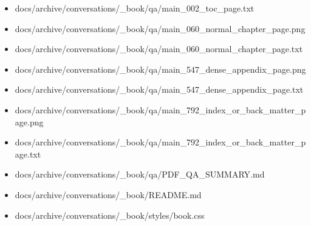 \documentclass[11pt,a4paper]{report}
\begin{document}
\begin{itemize}
\item docs/archive/conversations/\_book/qa/main\_002\_toc\_page.txt
\item docs/archive/conversations/\_book/qa/main\_060\_normal\_chapter\_page.png
\item docs/archive/conversations/\_book/qa/main\_060\_normal\_chapter\_page.txt
\item docs/archive/conversations/\_book/qa/main\_547\_dense\_appendix\_page.png
\item docs/archive/conversations/\_book/qa/main\_547\_dense\_appendix\_page.txt
\item docs/archive/conversations/\_book/qa/main\_792\_index\_or\_back\_matter\_page.png
\item docs/archive/conversations/\_book/qa/main\_792\_index\_or\_back\_matter\_page.txt
\item docs/archive/conversations/\_book/qa/PDF\_QA\_SUMMARY.md
\item docs/archive/conversations/\_book/README.md
\item docs/archive/conversations/\_book/styles/book.css
\end{itemize}
\end{document}

